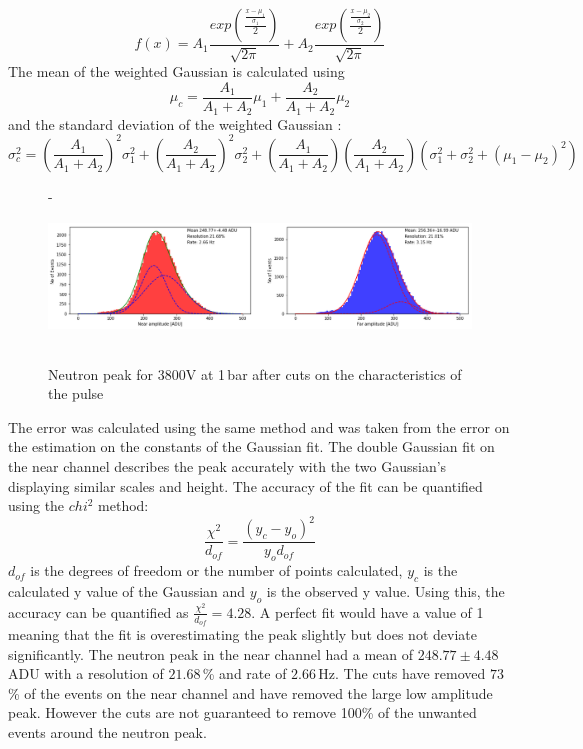 \documentclass[a4paper]{article}
\begin{document}
\begin{equation}
     f(x) = A_1\frac{exp(\frac{\frac{x-\mu_1}{\sigma_1}}{2})}{\sqrt{2\pi}} + A_2\frac{exp(\frac{\frac{x-\mu_2}{\sigma_2}}{2})}{\sqrt{2\pi}}
\end{equation}
The mean of the weighted Gaussian is calculated using 
\begin{equation}
    \mu_c = \frac{A_1}{A_1+A_2}\mu_1 + \frac{A_2}{A_1+A_2}\mu_2  
\end{equation}
and the standard deviation of the weighted Gaussian \cite{tzamarias}:
\begin{equation}
    \sigma_c^2 = \left(\frac{A_1}{A_1+A_2}\right)^2\sigma_1^2 + \left(\frac{A_2}{A_1+A_2}\right)^2\sigma_2^2 + \left(\frac{A_1}{A_1+A_2}\right)\left(\frac{A_2}{A_1+A_2}\right)(\sigma_1^2+\sigma_2^2+(\mu_1 - \mu_2)^2)
\end{equation}
\begin{figure}[H]- 
    \centering
    \includegraphics[height=3.7cm]{plots/uk24n001_amp.png}
    \caption{Neutron peak for 3800V at 1\,bar after cuts on the characteristics of the pulse}
    \label{fig:1aft}
\end{figure}
\noindent The error was calculated using the same method and was taken from the error on the estimation on the constants of the Gaussian fit. The double Gaussian fit on the near channel describes the peak accurately with the two Gaussian's displaying similar scales and height. The accuracy of the fit can be quantified using the $chi^2$ method:
\begin{equation}
   \frac{\chi^2}{d_{of}} =  \frac{(y_c-y_o)^2}{y_od_{of}}
   \label{eq:chi}
\end{equation}
$d_{of}$ is the degrees of freedom or the number of points calculated, $y_c$ is the calculated y value of the Gaussian and $y_o$ is the observed y value.
\newline Using this, the accuracy can be quantified as $\frac{\chi^2}{d_{of}} = 4.28$. A perfect fit would have a value of 1 meaning that the fit is overestimating the peak slightly but does not deviate significantly. The neutron peak in the near channel had a mean of $248.77 \pm 4.48$\,ADU with a resolution of $21.68$\,\% and rate of $2.66$\,Hz. The cuts have removed $73$\,\% of the events on the near channel and have removed the large low amplitude peak. However the cuts are not guaranteed to remove 100\% of the unwanted events around the neutron peak.
\end{document}
